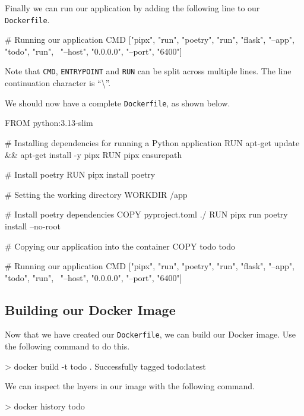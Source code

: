 \documentclass{csse4400}
\begin{document}
Finally we can run our application by adding the following line to our \texttt{Dockerfile}.

\begin{code}[language=docker,numbers=none]{}
# Running our application
CMD ["pipx", "run", "poetry", "run", "flask", "--app", "todo", "run", \
     "--host", "0.0.0.0", "--port", "6400"]
\end{code}

Note that \texttt{CMD}, \texttt{ENTRYPOINT} and \texttt{RUN} can be split across multiple lines.
The line continuation character is ``\textbackslash''.

\newpage
We should now have a complete \texttt{Dockerfile}, as shown below.

\begin{code}[language=docker,numbers=none]{}
FROM python:3.13-slim

# Installing dependencies for running a Python application
RUN apt-get update && apt-get install -y pipx
RUN pipx ensurepath

# Install poetry
RUN pipx install poetry

# Setting the working directory
WORKDIR /app

# Install poetry dependencies
COPY pyproject.toml ./
RUN pipx run poetry install --no-root

# Copying our application into the container
COPY todo todo

# Running our application
CMD ["pipx", "run", "poetry", "run", "flask", "--app", "todo", "run", \
     "--host", "0.0.0.0", "--port", "6400"]
\end{code}

\subsection{Building our Docker Image}

Now that we have created our \texttt{Dockerfile}, we can build our Docker image.
Use the following command to do this.

\begin{code}[language=bash,numbers=none]{}
> docker build -t todo .
Successfully tagged todo:latest
\end{code}

We can inspect the layers in our image with the following command.

\begin{code}[language=bash,numbers=none]{}
> docker history todo
\end{code}
\end{document}
